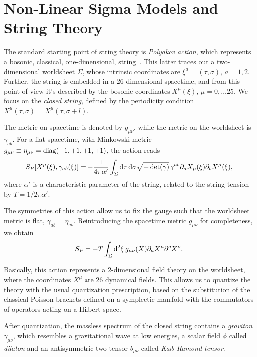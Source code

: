 \section{Non-Linear Sigma Models and String Theory}
The standard starting point of string theory is \emph{Polyakov action}, which represents a bosonic, classical, one-dimensional, string~\cite{weigand:string,polchinski:strings}. This latter traces out a two-dimensional worldsheet $\Sigma$, whose intrinsic coordinates are $\xi^a = (\tau, \sigma)$, $a = 1,2$. Further, the string is embedded in a $26$-dimensional spacetime, and from this point of view it's described by the bosonic coordinates $X^\mu(\xi)$, $\mu = 0, \dots 25$. We focus on the \emph{closed string}, defined by the periodicity condition $X^\mu(\tau,\sigma) = X^\mu (\tau, \sigma + l)$.

The metric on spacetime is denoted by $g_{\mu\nu}$, while the metric on the worldsheet is $\gamma_{ab}$. For a flat spacetime, with Minkowski metric $g_{\mu\nu} \equiv \eta_{\mu\nu} = \textup{diag}(-1,+1,+1,+1)$, the action reads
\begin{equation}\label{eq:polyakov}
    S_P [X^\mu(\xi), \gamma_{ab}(\xi)] = -\frac{1}{4\pi\alpha'} \int_\Sigma \mathop{}\!\mathrm{d} \tau \mathop{}\!\mathrm{d} \sigma \sqrt{-\det(\gamma)} \, \gamma^{ab} \partial_a X_\mu (\xi) \partial_b X^\mu (\xi),
\end{equation}
where $\alpha'$ is a characteristic parameter of the string, related to the string tension by $T = 1 / 2\pi\alpha'$.

The symmetries of this action allow us to fix the gauge such that the worldsheet metric is flat, $\gamma_{ab} = \eta_{ab}$. Reintroducing the spacetime metric $g_{\mu\nu}$ for completeness, we obtain
\begin{equation}\label{eq:polyakov-metric}
    S_P = - T \int_\Sigma \mathop{}\!\mathrm{d}^2 \xi \, g_{\mu\nu}(X) \partial_a X^\mu \partial^a X^\nu.
\end{equation}

Basically, this action represents a $2$-dimensional field theory on the worldsheet, where the coordinates $X^\mu$ are 26 dynamical fields. This allows us to quantize the theory with the usual quantization prescription, based on the substitution of the classical Poisson brackets defined on a symplectic manifold with the commutators of operators acting on a Hilbert space.

After quantization, the massless spectrum of the closed string contains a \emph{graviton} $\gamma_{\mu\nu}$, which resembles a gravitational wave at low energies, a scalar field $\phi$ called \emph{dilaton} and an antisymmetric two-tensor $b_{\mu\nu}$ called \emph{Kalb-Ramond tensor}.


